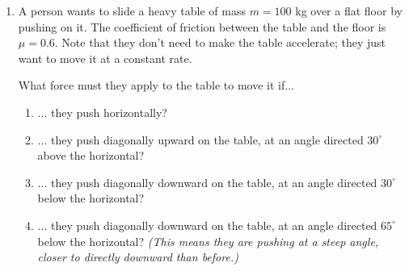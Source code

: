\documentclass[12pt]{article}
\begin{document}
\begin{enumerate}
\bigskip

%
%


\item 

A person wants to slide a heavy table of mass $m=100$ kg over a flat floor by pushing on it. The coefficient of friction between the table and the floor is $\mu=0.6$. Note that they don't need to make the table accelerate; they just want to move it at a constant rate.

\bigskip

What force must they apply to the table to move it if...

\begin{enumerate}
	\item ... they push horizontally?
	\item ... they push diagonally upward on the table, at an angle directed $30^\circ$ above the horizontal?
	\item ... they push diagonally downward on the table, at an angle directed $30^\circ$ below the horizontal?
	\item ... they push diagonally downward on the table, at an angle directed $65^\circ$ below the horizontal? {\it (This means they are pushing at a steep angle, closer to directly downward than before.)}


\end{enumerate}
\end{enumerate}
\end{document}
